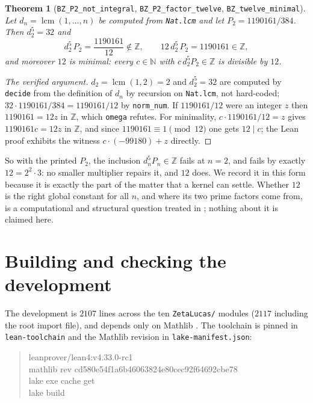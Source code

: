 \documentclass[11pt,reqno]{amsart}
\theoremstyle{plain}
\newtheorem{theorem}{Theorem}[section]
\theoremstyle{definition}
\theoremstyle{remark}
\newcommand{\Z}{\mathbb{Z}}
\newcommand{\N}{\mathbb{N}}
\newcommand{\lcm}{\operatorname{lcm}}
\newcommand{\Ln}[1]{\texttt{#1}}
\numberwithin{equation}{section}
\begin{document}
\begin{theorem}[\Ln{BZ\_P2\_not\_integral}, \Ln{BZ\_P2\_factor\_twelve},
\Ln{BZ\_twelve\_minimal}]\label{thm:twelve}
Let $d_n=\lcm(1,\dots,n)$ be computed from \Ln{Nat.lcm} and let $P_2=1190161/384$. Then
$d_2^5=32$ and
\[
   d_2^5\,P_2=\frac{1190161}{12}\notin\Z,
   \qquad
   12\,d_2^5\,P_2=1190161\in\Z,
\]
and moreover $12$ is minimal: every $c\in\N$ with $c\,d_2^5P_2\in\Z$ is divisible by $12$.
\end{theorem}

\begin{proof}[The verified argument]
$d_2=\lcm(1,2)=2$ and $d_2^5=32$ are computed by \Ln{decide} from the definition of
$d_n$ by recursion on \Ln{Nat.lcm}, not hard-coded; $32\cdot1190161/384=1190161/12$ by
\Ln{norm\_num}. If $1190161/12$ were an integer $z$ then $1190161=12z$ in $\Z$, which
\Ln{omega} refutes. For minimality, $c\cdot1190161/12=z$ gives $1190161c=12z$ in $\Z$, and
since $1190161\equiv1\pmod{12}$ one gets $12\mid c$; the Lean proof exhibits the witness
$c\cdot(-99180)+z$ directly.
\end{proof}

So with the printed $P_2$, the inclusion $d_n^5P_n\in\Z$ fails at $n=2$, and fails by exactly
$12=2^2\cdot3$: no smaller multiplier repairs it, and $12$ does. We record it in this form
because it is exactly the part of the matter that a kernel can settle. Whether $12$ is the
right global constant for all $n$, and where its two prime factors come from, is a
computational and structural question treated in \cite{PaperSharp}; nothing about it is
claimed here.

\section{Building and checking the development}
\label{sec:build}

The development is $2107$ lines across the ten \Ln{ZetaLucas/} modules ($2117$ including the
root import file), and depends only on Mathlib \cite{Mathlib,Lean4}. The toolchain is pinned
in \Ln{lean-toolchain} and the Mathlib revision in \Ln{lake-manifest.json}:

\begin{quote}\ttfamily\small
leanprover/lean4:v4.33.0-rc1\\
mathlib rev cd580e54f1a6b46063824e80cec92f64692cbe78\\[4pt]
lake exe cache get\\
lake build
\end{quote}
\end{document}
